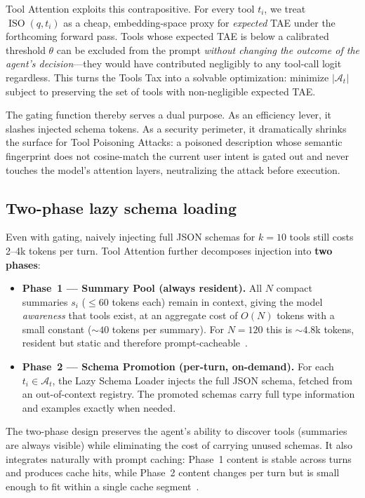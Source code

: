 \documentclass[11pt]{article}
\newcommand{\ISO}{\operatorname{ISO}}
\begin{document}
Tool Attention exploits this contrapositive. For every tool $t_i$, we treat $\ISO(q, t_i)$ as a cheap, embedding-space proxy for \emph{expected} TAE under the forthcoming forward pass. Tools whose expected TAE is below a calibrated threshold $\theta$ can be excluded from the prompt \emph{without changing the outcome of the agent's decision}---they would have contributed negligibly to any tool-call logit regardless. This turns the Tools Tax into a solvable optimization: minimize $\lvert \mathcal{A}_t \rvert$ subject to preserving the set of tools with non-negligible expected TAE.

The gating function thereby serves a dual purpose. As an efficiency lever, it slashes injected schema tokens. As a security perimeter, it dramatically shrinks the surface for Tool Poisoning Attacks: a poisoned description whose semantic fingerprint does not cosine-match the current user intent is gated out and never touches the model's attention layers, neutralizing the attack before execution.

\subsection{Two-phase lazy schema loading}

Even with gating, naively injecting full JSON schemas for $k=10$ tools still costs 2--4k tokens per turn. Tool Attention further decomposes injection into \textbf{two phases}:

\begin{itemize}
\item \textbf{Phase~1 --- Summary Pool (always resident).} All $N$ compact summaries $s_i$ ($\le 60$ tokens each) remain in context, giving the model \emph{awareness} that tools exist, at an aggregate cost of $O(N)$ tokens with a small constant ($\sim 40$ tokens per summary). For $N=120$ this is ${\sim}4.8$k tokens, resident but static and therefore prompt-cacheable~\citep{anthropic2025promptcache}.
\item \textbf{Phase~2 --- Schema Promotion (per-turn, on-demand).} For each $t_i \in \mathcal{A}_t$, the Lazy Schema Loader injects the full JSON schema, fetched from an out-of-context registry. The promoted schemas carry full type information and examples exactly when needed.
\end{itemize}

The two-phase design preserves the agent's ability to discover tools (summaries are always visible) while eliminating the cost of carrying unused schemas. It also integrates naturally with prompt caching: Phase~1 content is stable across turns and produces cache hits, while Phase~2 content changes per turn but is small enough to fit within a single cache segment~\citep{anthropic2025promptcache}.
\end{document}

